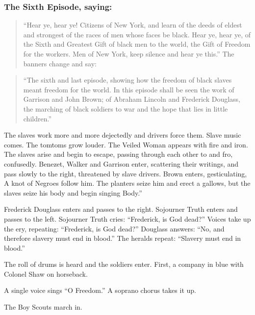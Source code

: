\documentclass[letterpaper,10pt,english]{jupyterBook}
\begin{document}
\subsubsection{The Sixth Episode, saying:}
\label{\detokenize{Volumes/06/07/national_emancipation_exposition:the-sixth-episode-saying}}\begin{quote}

\sphinxAtStartPar
“Hear ye, hear ye! Citizens of New York, and learn of the deeds of eldest and strongest of the races of men whose faces be black. Hear ye, hear ye, of the Sixth and Greatest Gift of black men to the world, the Gift of Freedom for the workers. Men of New York, keep silence and hear ye this.” The banners change and say:
\end{quote}
\begin{quote}

\sphinxAtStartPar
“The sixth and last episode, showing how the freedom of black slaves meant freedom for the world. In this episode shall be seen the work of Garrison and John Brown; of Abraham Lincoln and Frederick Douglass,  the marching of black soldiers to war and the hope that lies in little children.”
\end{quote}

\sphinxAtStartPar
The slaves work more and more dejectedly and drivers force them. Slave music comes. The tomtoms grow louder. The Veiled Woman appears with fire and iron. The slaves arise and begin to escape, passing through each other to and fro, confusedly. Benezet, Walker and Garrison enter, scattering their writings, and pass slowly to the right, threatened by slave drivers. Brown enters, gesticulating, A knot of Negroes follow him. The planters seize him and erect a gallows, but the slaves seize his body and begin singing Body.”

\sphinxAtStartPar
Frederick Douglass enters and passes to the right. Sojourner Truth enters and passes to the left. Sojourner Truth cries: “Frederick, is God dead?” Voices take up the ery, repeating: “Frederick, is God dead?” Douglass answers: “No, and therefore slavery must end in blood.” The heralds repeat: “Slavery must end in blood.”

\sphinxAtStartPar
The roll of drums is heard and the soldiers enter. First, a company in blue with Colonel Shaw on horseback.

\sphinxAtStartPar
A single voice sings “O Freedom.” A soprano chorus takes it up.

\sphinxAtStartPar
The Boy Scouts march in.
\end{document}

